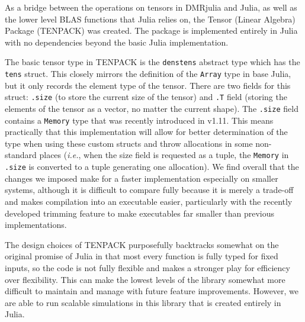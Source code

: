 \documentclass{juliacon}
\begin{document}
As a bridge between the operations on tensors in DMRjulia and Julia, as well as the lower level BLAS functions that Julia relies on, the Tensor (Linear Algebra) Package (TENPACK) was created. The package is implemented entirely in Julia with no dependencies beyond the basic Julia implementation.

The basic tensor type in TENPACK is the {\tt denstens} abstract type which has the {\tt tens} struct. This closely mirrors the definition of the {\tt Array} type in base Julia, but it only records the element type of the tensor. There are two fields for this struct: {\tt .size} (to store the current size of the tensor) and {\tt .T} field (storing the elements of the tensor as a vector, no matter the current shape). The {\tt .size} field contains a {\tt Memory} type that was recently introduced in v1.11. This means practically that this implementation will allow for better determination of the type when using these custom structs and throw allocations in some non-standard places ({\it i.e.}, when the size field is requested as a tuple, the {\tt Memory} in {\tt .size} is converted to a tuple generating one allocation). We find overall that the changes we imposed make for a faster implementation especially on smaller systems, although it is difficult to compare fully because it is merely a trade-off and makes compilation into an executable easier, particularly with the recently developed trimming feature to make executables far smaller than previous implementations.

The design choices of TENPACK purposefully backtracks somewhat on the original promise of Julia in that most every function is fully typed for fixed inputs, so the code is not fully flexible and makes a stronger play for efficiency over flexibility. This can make the lowest levels of the library somewhat more difficult to maintain and manage with future feature improvements. However, we are able to run scalable simulations in this library that is created entirely in Julia.
\end{document}
